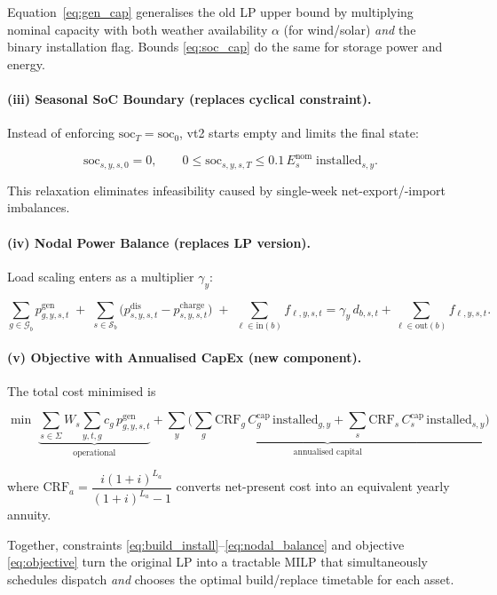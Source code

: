 Equation~\eqref{eq:gen_cap} generalises the old LP upper bound by multiplying nominal 
capacity with both weather availability $\alpha$ (for wind/solar) \emph{and} the binary 
installation flag.  
Bounds \eqref{eq:soc_cap} do the same for storage power and energy.

\paragraph{(iii) Seasonal SoC Boundary (replaces cyclical constraint).}
Instead of enforcing $\text{soc}_{T}= \text{soc}_{0}$, vt2 starts empty and limits the final state:

\begin{equation}
\text{soc}_{s,y,s,0}=0,\qquad
0\le\text{soc}_{s,y,s,T}\le 0.1\,E^{\text{nom}}_{s}\;
\text{installed}_{s,y}.
\label{eq:soc_boundary}
\end{equation}

This relaxation eliminates infeasibility caused by single-week net-export/-import imbalances.

\paragraph{(iv) Nodal Power Balance (replaces LP version).}
Load scaling enters as a multiplier $\gamma_y$:

\begin{equation}
\sum_{g\in\mathcal{G}_b} p^{\text{gen}}_{g,y,s,t}
\;+\;
\sum_{s\in\mathcal{S}_b}\!\bigl(p^{\text{dis}}_{s,y,s,t}-p^{\text{charge}}_{s,y,s,t}\bigr)
\;+\;
\sum_{\ell\in\text{in}(b)}\!\!f_{\ell,y,s,t}
=
\gamma_y\,d_{b,s,t}
+
\sum_{\ell\in\text{out}(b)}\!\!f_{\ell,y,s,t}.
\label{eq:nodal_balance}
\end{equation}

\paragraph{(v) Objective with Annualised CapEx (new component).}
The total cost minimised is

\begin{equation}
\min\;
\underbrace{\sum_{s\in\Sigma}\!W_s\sum_{y,t,g} c_g\,p^{\text{gen}}_{g,y,s,t}}_{\text{operational}}
+
\underbrace{\sum_{y}\!\bigl(
  \sum_{g}\! \text{CRF}_g\,C^{\text{cap}}_g\,\text{installed}_{g,y}
  +
  \sum_{s}\! \text{CRF}_s\,C^{\text{cap}}_s\,\text{installed}_{s,y}\bigr)}_{\text{annualised capital}}
\label{eq:objective}
\end{equation}

where $\text{CRF}_a=\dfrac{i(1+i)^{L_a}}{(1+i)^{L_a}-1}$ converts net-present cost into an equivalent yearly annuity.

\vspace{1ex}
\noindent
Together, constraints \eqref{eq:build_install}–\eqref{eq:nodal_balance} and objective \eqref{eq:objective} turn the original LP into a tractable MILP that simultaneously schedules dispatch \emph{and} chooses the optimal build/replace timetable for each asset.